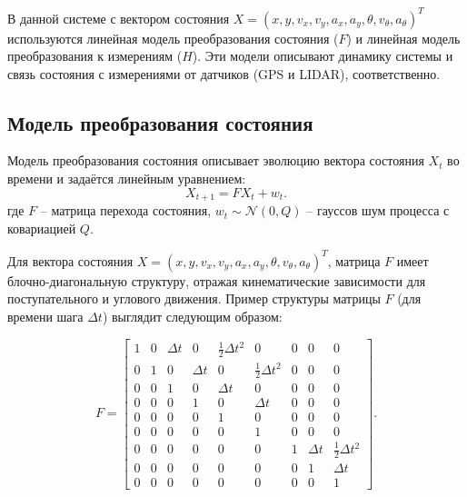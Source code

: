 В данной системе с вектором состояния 
\({X} = (x, y, v_x, v_y, a_x, a_y, \theta, v_\theta, a_\theta)^T\)
используются линейная модель преобразования состояния (\(F\)) и линейная модель преобразования к измерениям (\(H\)).
Эти модели описывают динамику системы и связь состояния с измерениями от датчиков (GPS и LIDAR), соответственно.

\subsection{Модель преобразования состояния}
\label{subsec:state_transition}

Модель преобразования состояния описывает эволюцию вектора состояния \({X}_t\) во времени и задаётся линейным уравнением:
\[
{X}_{t+1} = {F} {X}_t + {w}_t.
\]
где \({F}\) -- матрица перехода состояния, 
\({w}_t \sim \mathcal{N}(0, {Q})\) -- гауссов шум процесса с ковариацией \({Q}\).

Для вектора состояния \({X} = (x, y, v_x, v_y, a_x, a_y, \theta, v_\theta, a_\theta)^T\),
матрица \({F}\) имеет блочно-диагональную структуру,
отражая кинематические зависимости для поступательного и углового движения.
Пример структуры матрицы \({F}\) (для времени шага \(\Delta t\)) выглядит следующим образом:

\begin{equation}
{F} =
\begin{bmatrix}
1 & 0 & \Delta t & 0 & \frac{1}{2} \Delta t^2 & 0 & 0 & 0 & 0 \\
0 & 1 & 0 & \Delta t & 0 & \frac{1}{2} \Delta t^2 & 0 & 0 & 0 \\
0 & 0 & 1 & 0 & \Delta t & 0 & 0 & 0 & 0 \\
0 & 0 & 0 & 1 & 0 & \Delta t & 0 & 0 & 0 \\
0 & 0 & 0 & 0 & 1 & 0 & 0 & 0 & 0 \\
0 & 0 & 0 & 0 & 0 & 1 & 0 & 0 & 0 \\
0 & 0 & 0 & 0 & 0 & 0 & 1 & \Delta t & \frac{1}{2} \Delta t^2 \\
0 & 0 & 0 & 0 & 0 & 0 & 0 & 1 & \Delta t \\
0 & 0 & 0 & 0 & 0 & 0 & 0 & 0 & 1
\end{bmatrix}.
\end{equation}


